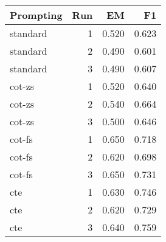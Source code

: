 \begin{tabular}{lrrr}
\toprule
Prompting & Run & EM & F1 \\
\midrule
standard & 1 & 0.520 & 0.623 \\
standard & 2 & 0.490 & 0.601 \\
standard & 3 & 0.490 & 0.607 \\
cot-zs & 1 & 0.520 & 0.640 \\
cot-zs & 2 & 0.540 & 0.664 \\
cot-zs & 3 & 0.500 & 0.646 \\
cot-fs & 1 & 0.650 & 0.718 \\
cot-fs & 2 & 0.620 & 0.698 \\
cot-fs & 3 & 0.650 & 0.731 \\
cte & 1 & 0.630 & 0.746 \\
cte & 2 & 0.620 & 0.729 \\
cte & 3 & 0.640 & 0.759 \\
\bottomrule
\end{tabular}
